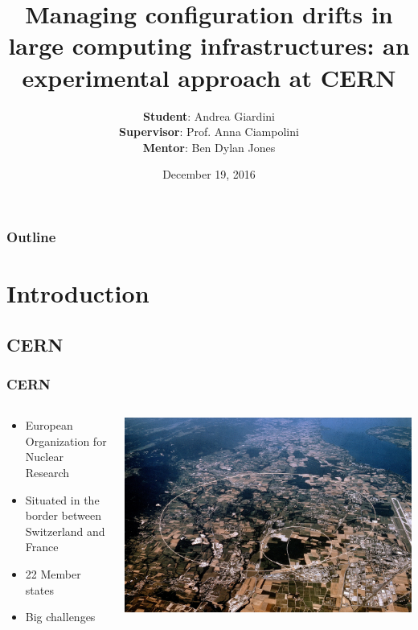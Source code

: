 \documentclass[aspectratio=169]{beamer}
\title{Managing configuration drifts in large computing infrastructures:
an experimental approach at CERN}
\author{ \vspace{20px}
    \textbf{Student}: \hspace{7px} Andrea Giardini \\
    \textbf{Supervisor}: Prof. Anna Ciampolini \\
    \textbf{Mentor}: \hspace{9px} Ben Dylan Jones \\}
\institute{University of Bologna}
\date{December 19, 2016}
\begin{document}
\begin{frame}
\titlepage
\end{frame}

\begin{frame}
\frametitle{Outline}
\vspace{10px}
\tableofcontents
\end{frame}


\section{Introduction}

\subsection{CERN}
\begin{frame}
    \frametitle{CERN}
    \begin{minipage}[t]{0.95\textwidth}
        \begin{columns}
            \begin{column}{0.5\textwidth}
                \begin{itemize}
                    \item European Organization for Nuclear Research
                    \item Situated in the border between Switzerland and France
                    \item 22 Member states
                    \item Big challenges
                \end{itemize}
            \end{column}
            \begin{column}{0.5\textwidth}
                \includegraphics[width=1.1\textwidth]{CernMap.jpg}
            \end{column}
        \end{columns}
    \end{minipage}
\end{frame}
\end{document}
